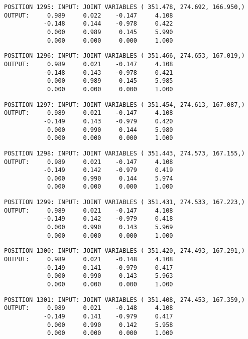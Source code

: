 \begin{verbatim}
POSITION 1295: INPUT: JOINT VARIABLES ( 351.478, 274.692, 166.950,)
OUTPUT:     0.989     0.022    -0.147     4.108
           -0.148     0.144    -0.978     0.422
            0.000     0.989     0.145     5.990
            0.000     0.000     0.000     1.000
\end{verbatim} \pagebreak[1]\begin{verbatim}
POSITION 1296: INPUT: JOINT VARIABLES ( 351.466, 274.653, 167.019,)
OUTPUT:     0.989     0.021    -0.147     4.108
           -0.148     0.143    -0.978     0.421
            0.000     0.989     0.145     5.985
            0.000     0.000     0.000     1.000
\end{verbatim} \pagebreak[1]\begin{verbatim}
POSITION 1297: INPUT: JOINT VARIABLES ( 351.454, 274.613, 167.087,)
OUTPUT:     0.989     0.021    -0.147     4.108
           -0.149     0.143    -0.979     0.420
            0.000     0.990     0.144     5.980
            0.000     0.000     0.000     1.000
\end{verbatim} \pagebreak[1]\begin{verbatim}
POSITION 1298: INPUT: JOINT VARIABLES ( 351.443, 274.573, 167.155,)
OUTPUT:     0.989     0.021    -0.147     4.108
           -0.149     0.142    -0.979     0.419
            0.000     0.990     0.144     5.974
            0.000     0.000     0.000     1.000
\end{verbatim} \pagebreak[1]\begin{verbatim}
POSITION 1299: INPUT: JOINT VARIABLES ( 351.431, 274.533, 167.223,)
OUTPUT:     0.989     0.021    -0.147     4.108
           -0.149     0.142    -0.979     0.418
            0.000     0.990     0.143     5.969
            0.000     0.000     0.000     1.000
\end{verbatim} \pagebreak[1]\begin{verbatim}
POSITION 1300: INPUT: JOINT VARIABLES ( 351.420, 274.493, 167.291,)
OUTPUT:     0.989     0.021    -0.148     4.108
           -0.149     0.141    -0.979     0.417
            0.000     0.990     0.143     5.963
            0.000     0.000     0.000     1.000
\end{verbatim} \pagebreak[1]\begin{verbatim}
POSITION 1301: INPUT: JOINT VARIABLES ( 351.408, 274.453, 167.359,)
OUTPUT:     0.989     0.021    -0.148     4.108
           -0.149     0.141    -0.979     0.417
            0.000     0.990     0.142     5.958
            0.000     0.000     0.000     1.000
\end{verbatim} \pagebreak[1]\begin{verbatim}

\end{verbatim}
